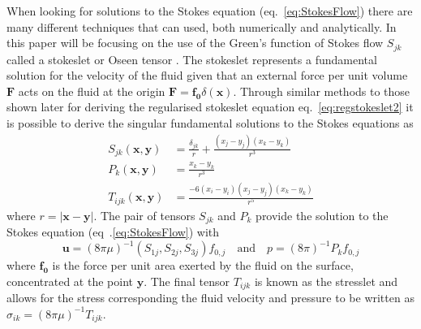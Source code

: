 When looking for solutions to the Stokes equation (eq.~\ref{eq:StokesFlow}) there are many different techniques that can used, both numerically and analytically. In this paper will be focusing on the use of the Green's function of Stokes flow $S_{jk}$ called a stokeslet\cite{Pozrikidis1992BoundaryFlow,Hancock1953TheLiquids} or Oseen tensor \cite{Oseen1927NeuereHydrodynamik}. The stokeslet represents a fundamental solution for the velocity of the fluid given that an external force per unit volume $\bm{F}$ acts on the fluid at the origin $\bm{F} = \bm{f_0}\delta(\bm{x})$\cite{Hancock1953TheLiquids, Batchelor2000AnDynamics}.
Through similar methods to those shown later for deriving the regularised stokeslet equation eq.~\ref{eq:regstokeslet2} it is possible to derive the singular fundamental solutions to the Stokes equations as
\begin{equation}
\label{eq:singularsolutions}
\begin{aligned}
    S_{j k}(\bm{x}, \bm{y}) &= \frac{\delta_{j k}}{r}+\frac{\left(x_{j}-y_{j}\right)\left(x_{k}-y_{k}\right)}{r^{3}} \\
    P_{k}(\bm{x}, \bm{y}) &= \frac{x_{k}-y_{k}}{r^{3}} \\
    T_{ijk}(\bm{x}, \bm{y}) &= \frac{-6\left(x_{i}-y_{i}\right)\left(x_{j}-y_{j}\right)\left(x_{k}-y_{k}\right)}{r^5}
\end{aligned}
\end{equation}
where $r=|\bm{x}-\bm{y}|$. The pair of tensors $S_{jk}$ and $P_k$ provide the solution to the Stokes equation (eq~.\ref{eq:StokesFlow}) with
\begin{equation*}
    \mathbf{u} = (8 \pi \mu)^{-1} \left(S_{1j},S_{2j},S_{3j}\right)f_{0,j} \quad \text{and} \quad p = (8 \pi)^{-1} P_k f_{0,j} 
\end{equation*}
where $\bm{f_{0}}$ is the force per unit area exerted by the fluid on the surface, concentrated at the point $\bm{y}$. The final tensor $T_{ijk}$ is known as the stresslet and allows for the stress corresponding the fluid velocity and pressure to be written as $\sigma_{ik}=(8 \pi \mu)^{-1}T_{ijk}$. 

